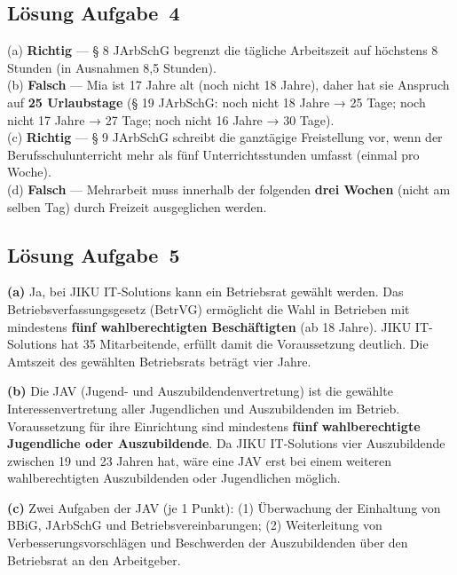 \documentclass[11pt, a4paper]{article}
\begin{document}
\subsection*{Lösung Aufgabe~4}
\begin{loesung}
(a) \textbf{Richtig} --- § 8 JArbSchG begrenzt die tägliche Arbeitszeit auf höchstens 8 Stunden (in Ausnahmen 8{,}5 Stunden).\\[0.4em]
(b) \textbf{Falsch} --- Mia ist 17 Jahre alt (noch nicht 18 Jahre), daher hat sie Anspruch auf \textbf{25 Urlaubstage} (§ 19 JArbSchG: noch nicht 18 Jahre → 25 Tage; noch nicht 17 Jahre → 27 Tage; noch nicht 16 Jahre → 30 Tage).\\[0.4em]
(c) \textbf{Richtig} --- § 9 JArbSchG schreibt die ganztägige Freistellung vor, wenn der Berufsschulunterricht mehr als fünf Unterrichtsstunden umfasst (einmal pro Woche).\\[0.4em]
(d) \textbf{Falsch} --- Mehrarbeit muss innerhalb der folgenden \textbf{drei Wochen} (nicht am selben Tag) durch Freizeit ausgeglichen werden.
\end{loesung}

\subsection*{Lösung Aufgabe~5}
\begin{loesung}
\textbf{(a)} Ja, bei JIKU IT-Solutions kann ein Betriebsrat gewählt werden. Das
Betriebsverfassungsgesetz (BetrVG) ermöglicht die Wahl in Betrieben mit mindestens
\textbf{fünf wahlberechtigten Beschäftigten} (ab 18 Jahre). JIKU IT-Solutions hat 35
Mitarbeitende, erfüllt damit die Voraussetzung deutlich. Die Amtszeit des gewählten
Betriebsrats beträgt vier Jahre.

\textbf{(b)} Die JAV (Jugend- und Auszubildendenvertretung) ist die gewählte Interessenvertretung
aller Jugendlichen und Auszubildenden im Betrieb. Voraussetzung für ihre Einrichtung sind
mindestens \textbf{fünf wahlberechtigte Jugendliche oder Auszubildende}. Da JIKU IT-Solutions
vier Auszubildende zwischen 19 und 23 Jahren hat, wäre eine JAV erst bei einem weiteren
wahlberechtigten Auszubildenden oder Jugendlichen möglich.

\textbf{(c)} Zwei Aufgaben der JAV (je 1 Punkt):
(1) Überwachung der Einhaltung von BBiG, JArbSchG und Betriebsvereinbarungen;
(2) Weiterleitung von Verbesserungsvorschlägen und Beschwerden der Auszubildenden über
den Betriebsrat an den Arbeitgeber.
\end{loesung}
\end{document}
